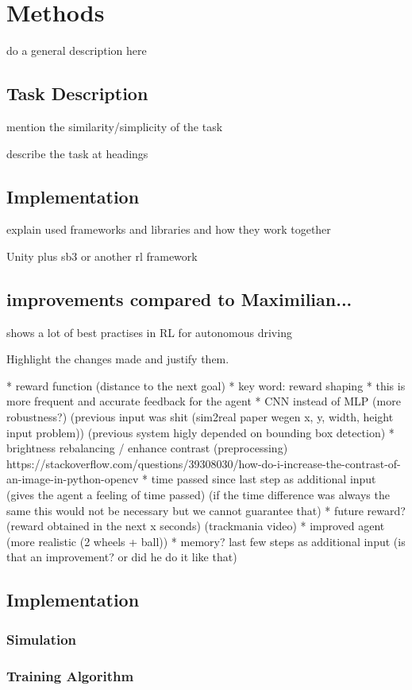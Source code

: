 \chapter{Methods}
\label{cha:Methods}

do a general description here


\section{Task Description}

mention the similarity/simplicity of the task

describe the task at headings


\section{Implementation}

explain used frameworks and libraries and how they work together

Unity plus sb3 or another rl framework 





\section{improvements compared to Maximilian...}

\autocite*{drl_for_ad} shows a lot of best practises in RL for autonomous driving

Highlight the changes made and justify them.

* reward function (distance to the next goal)
     * key word: reward shaping \autocite*{drl_for_ad}
     * this is more frequent and accurate feedback for the agent
* CNN instead of MLP (more robustness?) (previous input was shit (sim2real paper wegen x, y, width, height input problem)) (previous system higly depended on bounding box detection)
* brightness rebalancing / enhance contrast (preprocessing) https://stackoverflow.com/questions/39308030/how-do-i-increase-the-contrast-of-an-image-in-python-opencv
* time passed since last step as additional input (gives the agent a feeling of time passed) (if the time difference was always the same this would not be necessary but we cannot guarantee that)
* future reward? (reward obtained in the next x seconds) (trackmania video)
* improved agent (more realistic (2 wheels + ball))
* memory? last few steps as additional input (is that an improvement? or did he do it like that)





\section{Implementation}
\subsection{Simulation}

\subsection{Training Algorithm}



